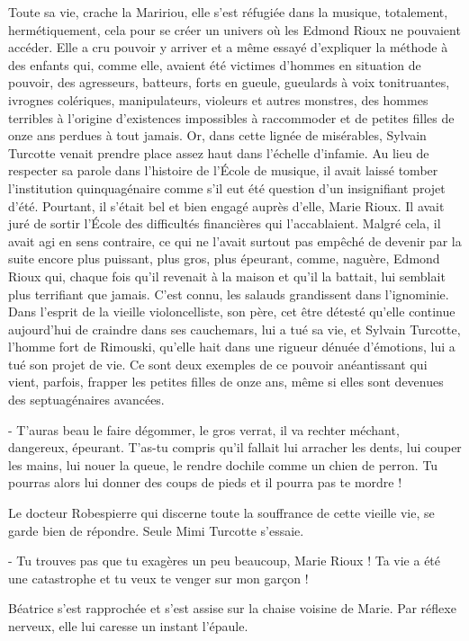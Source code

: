 Toute sa vie, crache la Maririou, elle s’est réfugiée dans la musique, totalement, hermétiquement, cela pour se créer un univers où les Edmond Rioux ne pouvaient accéder. Elle a cru pouvoir y arriver et a même essayé d’expliquer la méthode à des enfants qui, comme elle, avaient été victimes d’hommes en situation de pouvoir, des agresseurs, batteurs, forts en gueule, gueulards à voix tonitruantes, ivrognes colériques, manipulateurs, violeurs et autres monstres, des hommes terribles à l’origine d’existences impossibles à raccommoder et de petites filles de onze ans perdues à tout jamais. Or, dans cette lignée de misérables, Sylvain Turcotte venait prendre place assez haut dans l’échelle d’infamie. Au lieu de respecter sa parole dans l’histoire de l’École de musique, il avait laissé tomber l’institution quinquagénaire comme s’il eut été question d’un insignifiant projet d’été. Pourtant, il s’était bel et bien engagé auprès d’elle, Marie Rioux. Il avait juré de sortir l’École des difficultés financières qui l’accablaient. Malgré cela, il avait agi en sens contraire, ce qui ne l’avait surtout pas empêché de devenir par la suite encore plus puissant, plus gros, plus épeurant, comme, naguère, Edmond Rioux qui, chaque fois qu’il revenait à la maison et qu’il la battait, lui semblait plus terrifiant que jamais. C’est connu, les salauds grandissent dans l’ignominie. Dans l’esprit de la vieille violoncelliste, son père, cet être détesté qu’elle continue aujourd’hui de craindre dans ses cauchemars, lui a tué sa vie, et Sylvain Turcotte, l’homme fort de Rimouski, qu’elle hait dans une rigueur dénuée d’émotions, lui a tué son projet de vie. Ce sont deux exemples de ce pouvoir anéantissant qui vient, parfois, frapper les petites filles de onze ans, même si elles sont devenues des septuagénaires avancées.

- T’auras beau le faire dégommer, le gros verrat, il va rechter méchant, dangereux, épeurant. T’as-tu compris qu’il fallait lui arracher les dents, lui couper les mains, lui nouer la queue, le rendre dochile comme un chien de perron. Tu pourras alors lui donner des coups de pieds et il pourra pas te mordre !

Le docteur Robespierre qui discerne toute la souffrance de cette vieille vie, se garde bien de répondre. Seule Mimi Turcotte s’essaie.

- Tu trouves pas que tu exagères un peu beaucoup, Marie Rioux ! Ta vie a été une catastrophe et tu veux te venger sur mon garçon !

Béatrice s’est rapprochée et s’est assise sur la chaise voisine de Marie. Par réflexe nerveux, elle lui caresse un instant l’épaule.

